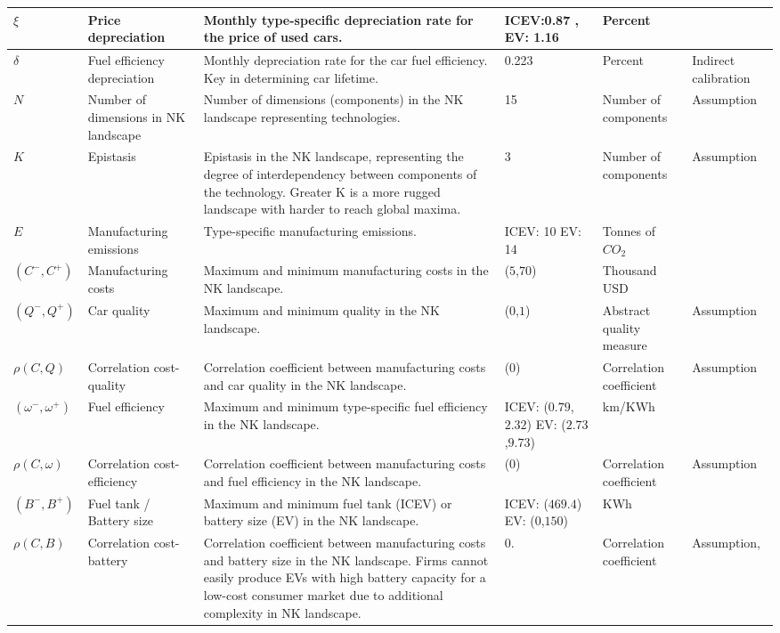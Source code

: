 \documentclass[12pt]{article}
\begin{document}
\begin{longtable}{p{}p{}p{}p{}p{}p{}}
		\hline
		$\xi$ & Price depreciation & Monthly type-specific depreciation rate for the price of used cars. & ICEV:0.87 , EV: 1.16 & Percent & \citep{SCHLOTER20222Depreciation} \\
		\hline
		$\delta$ & Fuel efficiency depreciation & Monthly depreciation rate for the car fuel efficiency. Key in determining car lifetime. & 0.223 & Percent & Indirect calibration \\
		\hline
		$N$ & Number of dimensions in NK landscape  & Number of dimensions (components) in the NK landscape representing technologies. & 15 & Number of components & Assumption \\
		\hline
		$K$ & Epistasis & Epistasis in the NK landscape, representing the degree of interdependency between components of the technology. Greater K is a more rugged landscape with harder to reach global maxima. & 3 & Number of components & Assumption \\
		\hline
		$E$ & Manufacturing emissions & Type-specific manufacturing emissions. & ICEV: 10 EV: 14 & Tonnes of $CO_2$ & \citep[1076]{ipcc2022transport} \\
		\hline
		$(C^-,C^+)$ & Manufacturing costs & Maximum and minimum manufacturing costs in the NK landscape. & ($5$,$70$) & Thousand USD & \citep{Grieco2024MarketPower} \\
		\hline
		$(Q^-,Q^+)$ & Car quality & Maximum and minimum quality in the NK landscape. & ($0$,$1$) & Abstract quality measure & Assumption \\
		\hline
		$\rho(C,Q)$ & Correlation cost-quality & Correlation coefficient between manufacturing costs and car quality in the NK landscape. & ($0$) & Correlation coefficient & Assumption \\
		\hline
		$(\omega^-,\omega^+)$ & Fuel efficiency & Maximum and minimum type-specific fuel efficiency in the NK landscape. & ICEV: ($0.79$,$2.32$) EV: ($2.73$,$9.73$) & km/KWh & \citep[Appendix 10.2]{ipcc2022transport} \\
		\hline
		$\rho(C,\omega)$ & Correlation cost-efficiency & Correlation coefficient between manufacturing costs and fuel efficiency in the NK landscape. & ($0$) & Correlation coefficient & Assumption \\
		\hline
		$(B^-,B^+)$ & Fuel tank / Battery size & Maximum and minimum fuel tank (ICEV) or battery size (EV) in the NK landscape. & ICEV: ($469.4$) EV: ($0$,$150$) & KWh & \citep{Schmuch2018} \\
		\hline
		$\rho(C,B)$ & Correlation cost-battery & Correlation coefficient between manufacturing costs and battery size in the NK landscape. Firms cannot easily produce EVs with high battery capacity for a low-cost consumer market due to additional complexity in NK landscape. & $0$.& Correlation coefficient & Assumption, \citep{yao2025critically} \\

\end{longtable}
\end{document}
